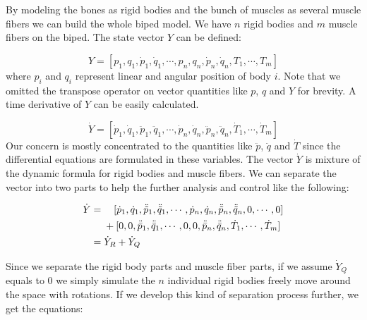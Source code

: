 \documentclass[a4paper,10pt]{article}
\begin{document}

By modeling the bones as rigid bodies and the bunch of muscles as several muscle
fibers we can build the whole biped model. We have $n$ rigid bodies and
$m$ muscle fibers on the biped. The state vector $Y$ can be defined:

\begin{equation}
Y = [ p_1, q_1, \dot{p}_1, \dot{q}_1, \cdots ,
      p_n, q_n, \dot{p}_n, \dot{q}_n,
      T_1, \cdots, T_m]
\end{equation}
where $p_i$ and $q_i$ represent linear and angular position of body $i$.
Note that we omitted the transpose operator on vector quantities like $p$,
$q$ and $Y$ for brevity. A time derivative of $Y$ can be easily
calculated.

\begin{equation}
\dot{Y} = [ \dot{p}_1, \dot{q}_1, \ddot{p}_1, \ddot{q}_1, \cdots ,
            \dot{p}_n, \dot{q}_n, \ddot{p}_n, \ddot{q}_n,
            \dot{T}_1, \cdots, \dot{T}_m]
\end{equation}
Our concern is mostly concentrated to the quantities like $\ddot{p}$,
$\ddot{q}$ and $\dot{T}$ since the differential equations are formulated
in these variables. The vector $\dot{Y}$ is mixture
of the dynamic formula for rigid bodies and muscle fibers. We can separate
the vector into two parts to help the further analysis and control like the
following:

\begin{align}
\dot{Y} = {} & \quad[ \dot{p}_1, \dot{q}_1, \ddot{\tilde{p}}_1, \ddot{\tilde{q}}_1, \cdots ,
                \dot{p}_n, \dot{q}_n, \ddot{\tilde{p}}_n, \ddot{\tilde{q}}_n,
                0, \cdots, 0]\notag\\
             & + [ 0, 0, \ddot{\bar{p}}_1, \ddot{\bar{q}}_1, \cdots ,
                0, 0, \ddot{\bar{p}}_n, \ddot{\bar{q}}_n,
                \dot{T}_1, \cdots, \dot{T}_m]\notag\\
        = {} & \dot{Y}_R + \dot{Y}_Q\label{SeparatedYdot}
\end{align}

Since we separate the rigid body parts and muscle fiber parts, if we
assume $\dot{Y}_Q$ equals to 0 we simply simulate the $n$ individual
rigid bodies freely move around the space with rotations. If we develop
this kind of separation process further, we get the equations:
\end{document}
